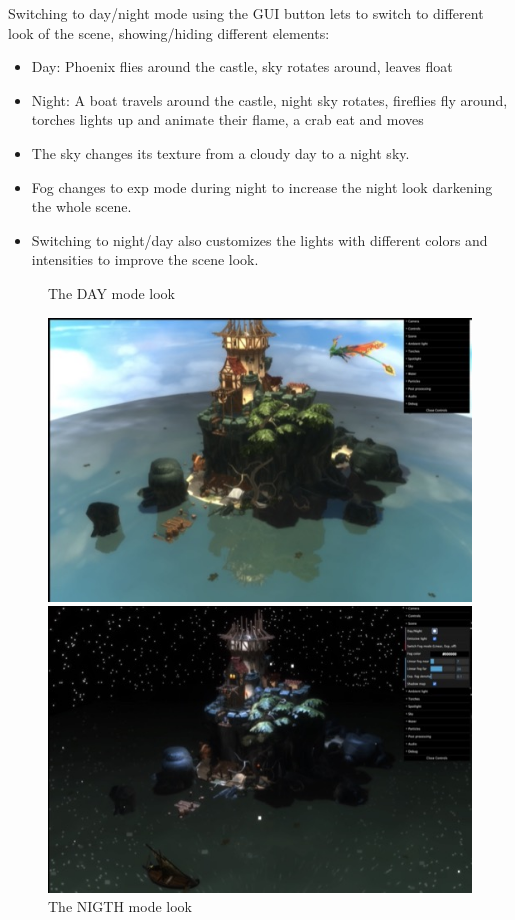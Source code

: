 \documentclass[10pt,a4paper]{article}
\begin{document}
Switching to day/night mode using the GUI button lets to switch to different look of the scene, showing/hiding different elements:

\begin{itemize}
 \item Day: Phoenix flies around  the castle, sky rotates around, leaves float
 \item Night: A boat travels around the castle, night sky rotates, fireflies fly around, torches lights up and animate their flame, a crab eat and moves
\end{itemize}

\begin{itemize}
 \item The sky changes its texture from a cloudy day to a night sky.
 \item Fog changes to exp mode during night to increase the night look darkening the whole scene.
 \item Switching to night/day also customizes the lights with different colors and intensities to improve the scene look.
\end{itemize}
\begin{center}
\begin{figure}[H]
\caption{The DAY mode look}
\includegraphics[width=1\textwidth,keepaspectratio]{day}
\caption{The NIGTH mode look}
\includegraphics[width=1\textwidth,keepaspectratio]{night}
\end{figure}
\end{center}
\end{document}
